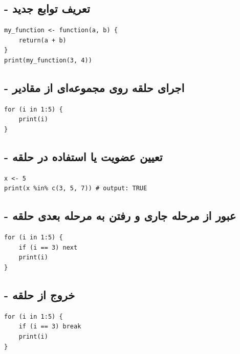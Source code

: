 \documentclass[11pt, a4paper, oneside]{book}
\begin{document}
			\subsection{ - تعریف توابع جدید}
				\begin{latin}
					\begin{lstlisting}[caption={\lr{function}}]
my_function <- function(a, b) {
	return(a + b)
}
print(my_function(3, 4))
					\end{lstlisting}
				\end{latin}
				
				
			\subsection{ - اجرای حلقه روی مجموعه‌ای از مقادیر}
				\begin{latin}
					\begin{lstlisting}[caption={\lr{for}}]
for (i in 1:5) {
	print(i)
}
					\end{lstlisting}
				\end{latin}
				
							
			\subsection{ - تعیین عضویت یا استفاده در حلقه}
				\begin{latin}
					\begin{lstlisting}[caption={\lr{in}}]
x <- 5
print(x %in% c(3, 5, 7)) # output: TRUE
					\end{lstlisting}
				\end{latin}				
				
			\subsection{ - عبور از مرحله جاری و رفتن به مرحله بعدی حلقه}
				\begin{latin}
					\begin{lstlisting}[caption={\lr{next}}]
for (i in 1:5) {
	if (i == 3) next
	print(i)
}
					\end{lstlisting}
				\end{latin}	
				
			\subsection{ - خروج از حلقه}
				\begin{latin}
					\begin{lstlisting}[caption={\lr{break}}]
for (i in 1:5) {
	if (i == 3) break
	print(i)
}
					\end{lstlisting}
				\end{latin}	
	
\end{document}
